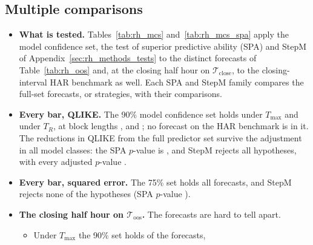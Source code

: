 \subsection{Multiple comparisons}
\label{app:rh_closing_mcs}
\begin{itemize}
\item \textbf{What is tested.} Tables~\ref{tab:rh_mcs} and~\ref{tab:rh_mcs_spa} apply the model confidence set, the
  test of superior predictive ability (SPA) and StepM of Appendix~\ref{sec:rh_methods_tests} to the
  \rhmcsNModelsWord{} distinct forecasts of Table~\ref{tab:rh_oos} and, at the closing half hour on
  $\mathcal T_{\mathrm{close}}$, to the closing-interval HAR benchmark as well. Each SPA and StepM family compares
  the \rhmcsNAlt{} full-set forecasts, or strategies, with their comparisons.
\item \textbf{Every bar, QLIKE.} The 90\% model confidence set holds \rhmcsBarQlikeTmaxSetNinety{} under $T_{\max}$
  and \rhmcsBarQlikeTrangeSetNinety{} under $T_R$, at block lengths \rhmcsBlockLo, \rhmcsBlock{} and
  \rhmcsBlockHi; no forecast on the HAR benchmark is in it. The reductions in QLIKE from the full predictor set
  survive the adjustment in all \rhorAfPairs{} model classes: the SPA $p$-value is \rhmcsBarQAfSpaC, and StepM
  rejects all \rhmcsNAlt{} hypotheses, with every adjusted $p$-value \rhmcsBarQAfPMax.
\item \textbf{Every bar, squared error.} The 75\% set holds all \rhmcsBarMseTmaxNSevenFive{} forecasts, and StepM
  rejects none of the \rhmcsNAlt{} hypotheses (SPA $p$-value \rhmcsBarMAfSpaC).
\item \textbf{The closing half hour on $\mathcal T_{\mathrm{oos}}$.} The forecasts are hard to tell apart.
  \begin{itemize}
  \item Under $T_{\max}$ the 90\% set holds \rhmcsAllQlikeTmaxNNinety{} of the \rhmcsNModels{} forecasts,

\end{itemize}
\end{itemize}
